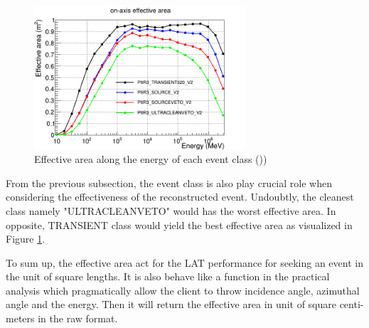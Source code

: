 \begin{figure}[h]
    \centering
    \includegraphics[width=0.7\textwidth]{content/background/figures/eff_event_class.png}
    \caption{Effective area along the energy of each event class (\cite{lat_p8_performance}))}
    \label{fig:eff_event_class}
\end{figure}


From the previous subsection, the event class is also play crucial 
role when considering the effectiveness of the reconstructed event.
Undoubtly, the cleanest class namely "ULTRACLEANVETO" would has 
the worst effective area. In opposite, TRANSIENT class would yield 
the best effective area as visualized in Figure \ref{fig:eff_event_class}.

To sum up, the effective area act for the LAT performance for seeking 
an event in the unit of square lengths. It is also behave like a function 
in the practical analysis which pragmatically allow the client to 
throw incidence angle, azimuthal angle and the energy. Then it will 
return the effective area in unit of square centi-meters in the raw 
format.